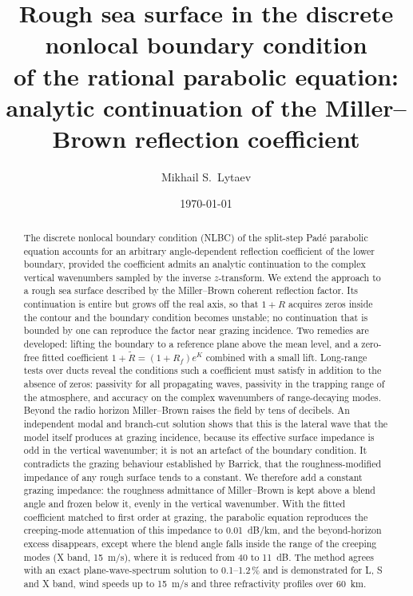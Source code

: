 \documentclass[11pt,a4paper]{article}
\title{Rough sea surface in the discrete nonlocal boundary condition\\
of the rational parabolic equation:\\
analytic continuation of the Miller--Brown reflection coefficient}
\author{Mikhail S.\ Lytaev}
\date{\today}
\newcommand{\Rt}{\tilde R}
\begin{document}
\maketitle

\begin{abstract}
The discrete nonlocal boundary condition (NLBC) of the split-step Pad\'e parabolic
equation accounts for an arbitrary angle-dependent reflection coefficient of the
lower boundary, provided the coefficient admits an analytic continuation to the
complex vertical wavenumbers sampled by the inverse $z$-transform. We extend the
approach to a rough sea surface described by the Miller--Brown coherent reflection
factor. Its continuation is entire but grows off the real axis, so that $1+R$
acquires zeros inside the contour and the boundary condition becomes unstable;
no continuation that is bounded by one can reproduce the factor near grazing
incidence. Two remedies are developed: lifting the boundary to a reference plane
above the mean level, and a zero-free fitted coefficient
$1+\Rt=(1+R_f)e^{K}$ combined with a small lift. Long-range tests over ducts reveal
the conditions such a coefficient must satisfy in addition to the absence of
zeros: passivity for all propagating waves, passivity in the trapping range of
the atmosphere, and accuracy on the complex wavenumbers of range-decaying modes.
Beyond the radio horizon Miller--Brown raises the field by tens of decibels. An
independent modal and branch-cut solution shows that this is the lateral wave
that the model itself produces at grazing incidence, because its effective surface
impedance is odd in the vertical wavenumber; it is not an artefact of the boundary
condition. It contradicts the grazing behaviour established by Barrick, that the
roughness-modified impedance of any rough surface tends to a constant. We therefore
add a constant grazing impedance: the roughness admittance of Miller--Brown is kept
above a blend angle and frozen below it, evenly in the vertical wavenumber. With the
fitted coefficient matched to first order at grazing, the parabolic equation
reproduces the creeping-mode attenuation of this impedance to \SI{0.01}{dB/km}, and the
beyond-horizon excess disappears, except where the blend angle falls inside the
range of the creeping modes (X band, \SI{15}{m/s}), where it is reduced from 40 to
\SI{11}{dB}. The method agrees with an exact plane-wave-spectrum
solution to 0.1--1.2\,\% and is demonstrated for L, S and X band, wind speeds up to
\SI{15}{m/s} and three refractivity profiles over \SI{60}{km}.
\end{abstract}
\end{document}
